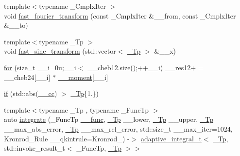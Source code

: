 \begin{DoxyCompactItemize}
\item 
{\footnotesize template$<$typename \+\_\+\+Cmplx\+Iter $>$ }\\void \hyperlink{namespace____gnu__cxx_a8e1dab366323a810c9915329b520aa5a}{fast\+\_\+fourier\+\_\+transform} (const \+\_\+\+Cmplx\+Iter \&\+\_\+\+\_\+from, const \+\_\+\+Cmplx\+Iter \&\+\_\+\+\_\+to)
\item 
{\footnotesize template$<$typename \+\_\+\+Tp $>$ }\\void \hyperlink{namespace____gnu__cxx_a97f96274ac4998cf6a7c37fcb48c9bff}{fast\+\_\+sine\+\_\+transform} (std\+::vector$<$ \hyperlink{namespace____gnu__cxx_a3b19a9c800ca194374ef9172290f7d79}{\+\_\+\+Tp} $>$ \&\+\_\+\+\_\+x)
\item 
\hyperlink{namespace____gnu__cxx_ad851cfdb017da1c6a6466f982d591a52}{for} (size\+\_\+t \+\_\+\+\_\+i=0u;\+\_\+\+\_\+i$<$ \+\_\+\+\_\+cheb12.\+size();++\+\_\+\+\_\+i) \+\_\+\+\_\+res12+ = \+\_\+\+\_\+cheb24\mbox{[}\+\_\+\+\_\+i\mbox{]} $\ast$ \hyperlink{namespace____gnu__cxx_aa353478f1f8d25130d4fc48bf804a24c}{\+\_\+\+\_\+moment}\mbox{[}\+\_\+\+\_\+i\mbox{]}
\item 
\hyperlink{namespace____gnu__cxx_ad7229840e09434bca7fe1142880bce8b}{if} (std\+::abs(\hyperlink{namespace____gnu__cxx_a7994ff975ddada084e4a738578302940}{\+\_\+\+\_\+cc}) $>$ \hyperlink{namespace____gnu__cxx_a3b19a9c800ca194374ef9172290f7d79}{\+\_\+\+Tp}\{1.\})
\item 
{\footnotesize template$<$typename \+\_\+\+Tp , typename \+\_\+\+Func\+Tp $>$ }\\auto \hyperlink{namespace____gnu__cxx_aa449f51cfcccb7983ff2703333ffb41e}{integrate} (\+\_\+\+Func\+Tp \hyperlink{namespace____gnu__cxx_af2b2f0c7a2ae72b922b1afefae5a65b2}{\+\_\+\+\_\+func}, \hyperlink{namespace____gnu__cxx_a3b19a9c800ca194374ef9172290f7d79}{\+\_\+\+Tp} \+\_\+\+\_\+lower, \hyperlink{namespace____gnu__cxx_a3b19a9c800ca194374ef9172290f7d79}{\+\_\+\+Tp} \+\_\+\+\_\+upper, \hyperlink{namespace____gnu__cxx_a3b19a9c800ca194374ef9172290f7d79}{\+\_\+\+Tp} \+\_\+\+\_\+max\+\_\+abs\+\_\+error, \hyperlink{namespace____gnu__cxx_a3b19a9c800ca194374ef9172290f7d79}{\+\_\+\+Tp} \+\_\+\+\_\+max\+\_\+rel\+\_\+error, std\+::size\+\_\+t \+\_\+\+\_\+max\+\_\+iter=1024, Kronrod\+\_\+\+Rule \+\_\+\+\_\+qkintrule=Kronrod\+\_) -\/$>$ \hyperlink{struct____gnu__cxx_1_1adaptive__integral__t}{adaptive\+\_\+integral\+\_\+t}$<$ \hyperlink{namespace____gnu__cxx_a3b19a9c800ca194374ef9172290f7d79}{\+\_\+\+Tp}, std\+::invoke\+\_\+result\+\_\+t$<$ \+\_\+\+Func\+Tp, \hyperlink{namespace____gnu__cxx_a3b19a9c800ca194374ef9172290f7d79}{\+\_\+\+Tp} $>$$>$
$$
\end{DoxyCompactItemize}
